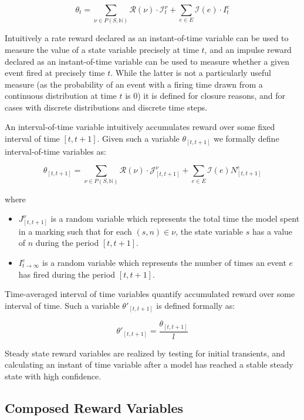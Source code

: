 \documentclass[11pt]{article}
\begin{document}
\[ \theta_t = \sum_{\nu \in P(S, \mathbb{N})} \mathcal{R}(\nu) \cdot \mathcal{I}^{\nu}_t + \sum_{e \in E} \mathcal{I}(e) \cdot I_t^e\]

Intuitively a rate reward declared as an instant-of-time variable \cite{freire1990technique} can be used to measure the value of a state variable precisely at time $t$, and an impulse reward declared as an instant-of-time variable can be used to measure whether a given event fired at precisely time $t$.  While the latter is not a particularly useful measure (as the probability of an event with a firing time drawn from a continuous distribution at time $t$ is $0$) it is defined for closure reasons, and for cases with discrete distributions and discrete time steps.

An interval-of-time variable intuitively accumulates reward over some fixed interval of time $[t, t+1]$.  Given such a variable $\theta_{[t, t+1]}$ we formally define interval-of-time variables as:

\[\theta_{[t,t+1]} = \sum_{\nu \in P(S, \mathbb{N})} \mathcal{R}(\nu) \cdot \mathcal{J}^{\nu}_{[t, t+1]} + \sum_{e \in E} \mathcal{I}(e)N^e_{[t,t+1]}\]

where

\begin{itemize}
\item $J^{\nu}_{[t,t+1]}$ is a random variable which represents the total time the model spent in a marking such that for each $(s, n) \in \nu$, the state variable $s$ has a value of $n$ during the period $[t, t+1]$.
\item $I^e_{t\rightarrow\infty}$ is a random variable which represents the number of times an event $e$ has fired during the period $[t, t+1]$.
\end{itemize}

Time-averaged interval of time variables quantify accumulated reward over some interval of time.  Such a variable $\theta'_{[t,t+1]}$ is defined formally as:

\[\theta'_{[t,t+1]} = \frac{\theta_{[t,t+1]}}{l}\]

Steady state reward variables are realized by testing for initial transients, and calculating an instant of time variable after a model has reached a stable steady state with high confidence.

\subsection{Composed Reward Variables}
\end{document}

